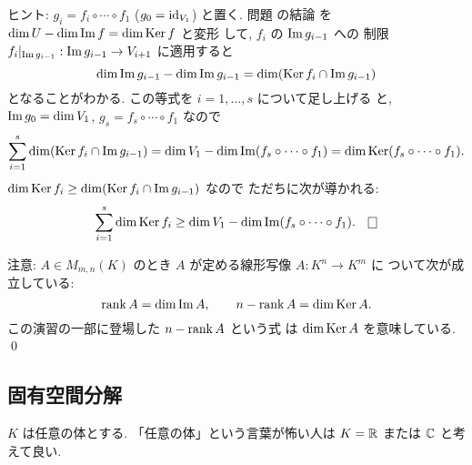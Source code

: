 \documentclass[12pt,twoside]{jarticle}
\begin{document}
\medskip
\noindent
ヒント: $g_i=f_i\circ\cdots\circ f_1$ ($g_0=\mathop{\mathrm{id}}\nolimits_{V_1}$) と置く.
問題  の結論
を $\dim U - \dim\mathop{\mathrm{Im}}\nolimits f = \dim\mathop{\mathrm{Ker}}\nolimits f$ と変形
して, $f_i$ の $\mathop{\mathrm{Im}}\nolimits g_{i-1}$ への
制限 $f_i|_{\mathop{\mathrm{Im}}\nolimits g_{i-1}}
:\mathop{\mathrm{Im}}\nolimits g_{i-1}\to V_{i+1}$ に適用すると
\begin{equation*}
  \dim\mathop{\mathrm{Im}}\nolimits g_{i-1} - \dim\mathop{\mathrm{Im}}\nolimits g_{i-1}
  = \dim(\mathop{\mathrm{Ker}}\nolimits f_i\cap\mathop{\mathrm{Im}}\nolimits g_{i-1})
\end{equation*}
となることがわかる.  
この等式を $i=1,\dots,s$ について足し上げる
と, $\mathop{\mathrm{Im}}\nolimits g_0 = \dim V_1$, $g_s=f_s\circ\cdots\circ f_1$ なので
\begin{equation*}
    \sum_{i=1}^s \dim(\mathop{\mathrm{Ker}}\nolimits f_i \cap \mathop{\mathrm{Im}}\nolimits g_{i-1}) 
    = \dim V_1 - \dim\mathop{\mathrm{Im}}\nolimits(f_s\circ\cdots\circ f_1)
    = \dim\mathop{\mathrm{Ker}}\nolimits(f_s\circ\cdots\circ f_1).
\end{equation*}
$\dim\mathop{\mathrm{Ker}}\nolimits f_i\ge\dim(\mathop{\mathrm{Ker}}\nolimits f_i \cap \mathop{\mathrm{Im}}\nolimits g_{i-1})$ なので
ただちに次が導かれる:
\begin{equation*}
  \sum_{i=1}^s \dim\Ker f_i
  \ge \dim V_1 - \dim\Image(f_s\circ\cdots\circ f_1).
\qed
\end{equation*}

\medskip
\noindent
注意: $A\in M_{m,n}(K)$ のとき $A$ が定める線形写像 $A:K^n\to K^m$ に
ついて次が成立している:
\begin{equation*}
   \mathop{\mathrm{rank}}\nolimits A = \dim\mathop{\mathrm{Im}}\nolimits A, \qquad  n - \mathop{\mathrm{rank}}\nolimits A = \dim\mathop{\mathrm{Ker}}\nolimits A.
\end{equation*}
この演習の一部に登場した $n - \mathop{\mathrm{rank}}\nolimits A$ という式
は $\dim\mathop{\mathrm{Ker}}\nolimits A$ を意味している.
\qed


\subsection{固有空間分解}
\label{sec:eigenspace-decomp}

$K$ は任意の体とする.  「任意の体」という言葉が怖い人は $K={\mathbb R}$ または ${\mathbb C}$ 
と考えて良い.
\end{document}
